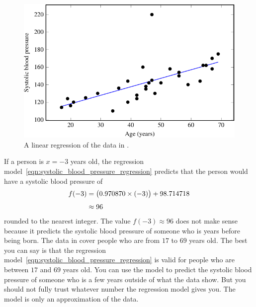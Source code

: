 \documentclass[a4paper,oneside,12pt]{article}
\begin{document}
\begin{solution}
\begin{table}[!htbp]
\centering

\caption{%
  Detailed calculation of the regression line for the data in
  .  Most numbers have been rounded to six
  decimal places so as to fit the table.  However, you should not
  round numbers during the calculation.  For a big data set like
  , you should use a spreadsheet software
  package to calculate each number.
}
\label{tab:blood_pressure_regression}
\end{table}

\begin{figure}[!htbp]
\centering
\includegraphics[scale=1.1]{image/07/blood-pressure-regression.pdf}
\caption{%
  A linear regression of the data in .
}
\label{fig:blood_pressure_regression}
\end{figure}

If a person is $x = -3$ years old, the regression
model~\eqref{eqn:systolic_blood_pressure_regression} predicts that the
person would have a systolic blood pressure of
\begin{align*}
f(-3)
&=
\big(0.970870 \times (-3)\big) + 98.714718 \\[4pt]
&\approx
96
\end{align*}
rounded to the nearest integer.  The value $f(-3) \approx 96$ does not
make sense because it predicts the systolic blood pressure of someone
who is years before being born.  The data in
 cover people who are from $17$ to $69$
years old.  The best you can say is that the regression
model~\eqref{eqn:systolic_blood_pressure_regression} is valid for
people who are between $17$ and $69$ years old.  You can use the model
to predict the systolic blood pressure of someone who is a few years
outside of what the data show.  But you should not fully trust
whatever number the regression model gives you.  The model is only an
approximation of the data.
\end{solution}
\end{document}
